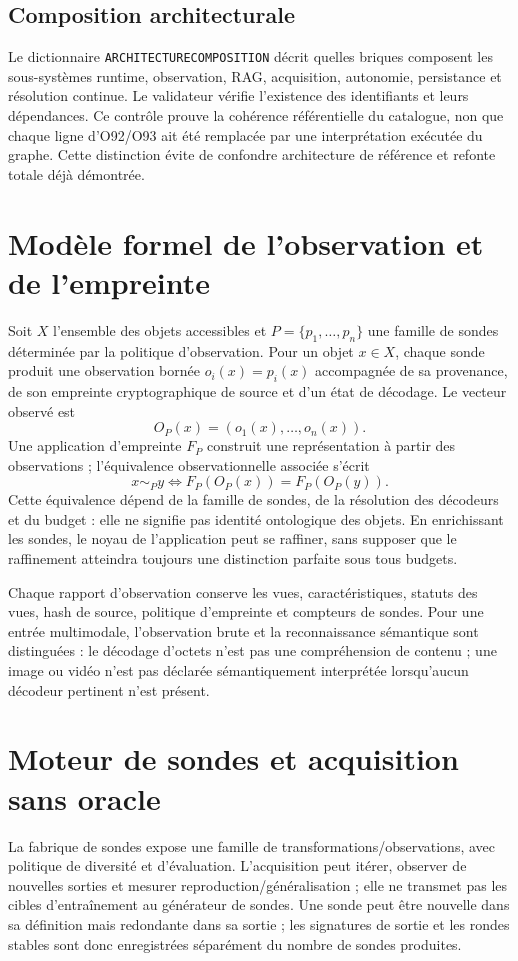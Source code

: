 \documentclass[11pt,a4paper]{article}
\begin{document}
\subsection{Composition architecturale}
Le dictionnaire \texttt{ARCHITECTURE\textunderscore COMPOSITION} décrit quelles briques composent les sous-systèmes runtime, observation, RAG, acquisition, autonomie, persistance et résolution continue. Le validateur vérifie l'existence des identifiants et leurs dépendances. Ce contrôle prouve la cohérence référentielle du catalogue, non que chaque ligne d'O92/O93 ait été remplacée par une interprétation exécutée du graphe. Cette distinction évite de confondre architecture de référence et refonte totale déjà démontrée.

\section{Modèle formel de l'observation et de l'empreinte}
Soit $X$ l'ensemble des objets accessibles et $P=\{p_1,\ldots,p_n\}$ une famille de sondes déterminée par la politique d'observation. Pour un objet $x\in X$, chaque sonde produit une observation bornée $o_i(x)=p_i(x)$ accompagnée de sa provenance, de son empreinte cryptographique de source et d'un état de décodage. Le vecteur observé est
\[
  O_P(x)=(o_1(x),\ldots,o_n(x)).
\]
Une application d'empreinte $F_P$ construit une représentation à partir des observations ; l'équivalence observationnelle associée s'écrit
\[
  x\sim_P y \iff F_P(O_P(x))=F_P(O_P(y)).
\]
Cette équivalence dépend de la famille de sondes, de la résolution des décodeurs et du budget : elle ne signifie pas identité ontologique des objets. En enrichissant les sondes, le noyau de l'application peut se raffiner, sans supposer que le raffinement atteindra toujours une distinction parfaite sous tous budgets.

Chaque rapport d'observation conserve les vues, caractéristiques, statuts des vues, hash de source, politique d'empreinte et compteurs de sondes. Pour une entrée multimodale, l'observation brute et la reconnaissance sémantique sont distinguées : le décodage d'octets n'est pas une compréhension de contenu ; une image ou vidéo n'est pas déclarée sémantiquement interprétée lorsqu'aucun décodeur pertinent n'est présent.

\section{Moteur de sondes et acquisition sans oracle}
La fabrique de sondes expose une famille de transformations/observations, avec politique de diversité et d'évaluation. L'acquisition peut itérer, observer de nouvelles sorties et mesurer reproduction/généralisation ; elle ne transmet pas les cibles d'entraînement au générateur de sondes. Une sonde peut être nouvelle dans sa définition mais redondante dans sa sortie ; les signatures de sortie et les rondes stables sont donc enregistrées séparément du nombre de sondes produites.
\end{document}
